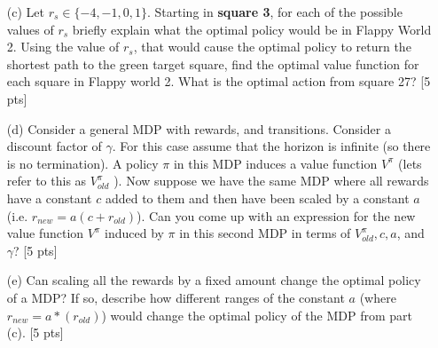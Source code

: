 \documentclass[11pt]{article}
\begin{document}
\begin{enumerate}

\item[(c)] Let $r_s \in \{-4,-1,0,1\}$. Starting in \textbf{square 3}, for each of the possible values of $r_s$ briefly explain what the optimal policy would be in Flappy World 2. Using the value of $r_s$, that would cause the optimal policy to return the shortest path to the green target square, find the optimal value function for each square in Flappy world 2. What is the optimal action from square 27? [5 pts]


\item[(d)] Consider a general MDP with rewards, and transitions. Consider a discount factor of $\gamma$. For this case assume that the horizon is infinite (so there is no termination). A policy $\pi$ in
this MDP induces a value function $V^{\pi}$ (lets refer to this as $V^{\pi}_{old}$ ). Now suppose we have the same MDP where all rewards have a constant $c$ added to them and then have been scaled by a constant $a$ (i.e. $r_{new} = a(c+ r_{old})$). Can you come up with an expression for the new value function $V^{\pi}$ induced by $\pi$ in this second MDP in terms of $V^{\pi}_{old}, c, a$, and $\gamma$? [5 pts]

\item[(e)] Can scaling all the rewards by a fixed amount change the optimal policy of a MDP? If so, describe how different ranges of the constant $a$ (where $r_{new} = a*(r_{old})$) would change the optimal policy of the MDP from part (c). [5 pts]


\end{enumerate}
\end{document}
